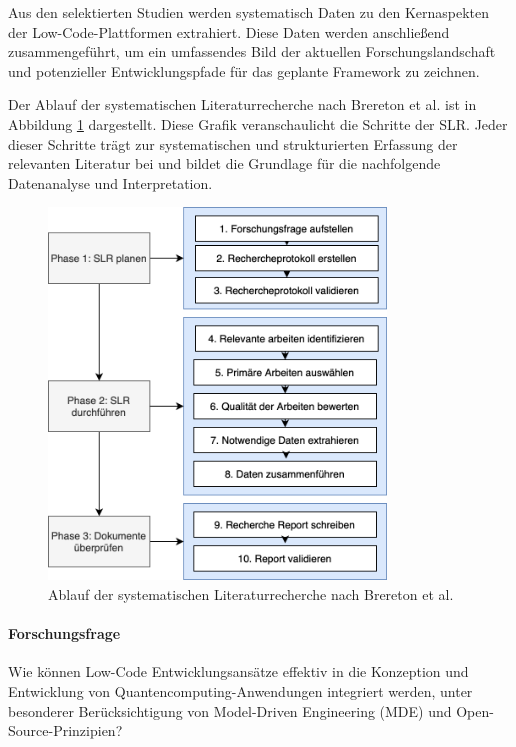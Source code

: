 Aus den selektierten Studien werden systematisch Daten zu den Kernaspekten der 
Low-Code-Plattformen extrahiert. Diese Daten werden anschließend zusammengeführt, um ein 
umfassendes Bild der aktuellen Forschungslandschaft und potenzieller Entwicklungspfade für 
das geplante Framework zu zeichnen.

Der Ablauf der systematischen Literaturrecherche nach Brereton et al. \cite{brereton2007lessons} 
ist in Abbildung \ref{fig:slr_kitchenham} dargestellt. 
Diese Grafik veranschaulicht die Schritte der SLR. Jeder dieser Schritte trägt zur systematischen und 
strukturierten Erfassung der relevanten Literatur bei und bildet die Grundlage für die nachfolgende 
Datenanalyse und Interpretation.

\begin{figure}[h!]
    \centering
    \includegraphics[width=0.8\textwidth]{graphics/slr_kitchenham_ablauf.png}
    \caption{Ablauf der systematischen Literaturrecherche nach Brereton et al. \cite{brereton2007lessons}}
    \label{fig:slr_kitchenham}
\end{figure}

\paragraph{Forschungsfrage}
Wie können Low-Code Entwicklungsansätze effektiv in die Konzeption und Entwicklung von Quantencomputing-Anwendungen 
integriert werden, unter besonderer Berücksichtigung von Model-Driven Engineering (MDE) und Open-Source-Prinzipien?

